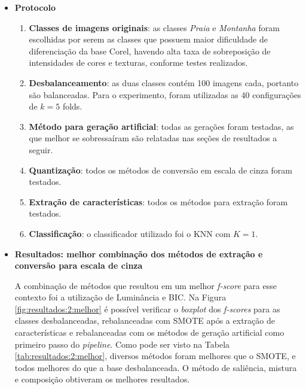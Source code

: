 \begin{itemize}
\item[] \textbf{Protocolo}
\begin{enumerate}
\item \textbf{Classes de imagens originais}: as classes \textit{Praia} e \emph{Montanha} foram escolhidas por serem as classes que possuem maior dificuldade de diferenciação da base Corel, havendo alta taxa de sobreposição de intensidades de cores e texturas, conforme testes realizados.

\item \textbf{Desbalanceamento}: as duas classes contém 100 imagens cada, portanto são balanceadas. Para o experimento, foram utilizadas as 40 configurações de $k=5$ folds.

\item \textbf{Método para geração artificial}: todas as gerações foram testadas, as que melhor se sobressaíram são relatadas nas seções de resultados a seguir.

\item \textbf{Quantização}: todos os métodos de conversão em escala de cinza foram testados.

\item \textbf{Extração de características}: todos os métodos para extração foram testados.

\item \textbf{Classificação}: o classificador utilizado foi o KNN com $K=1$.
\end{enumerate}

\item[] \textbf{Resultados: melhor combinação dos métodos de extração e conversão para escala de cinza}

A combinação de métodos que resultou em um melhor \textit{f-score} para esse contexto foi a utilização de Luminância e BIC. Na Figura \ref{fig:resultados:2:melhor} é possível verificar o \textit{boxplot} dos \textit{f-scores} para as classes desbalanceadas, rebalanceadas com SMOTE após a extração de características e rebalanceadas com os métodos de geração artificial como primeiro passo do \textit{pipeline}. Como pode ser visto na Tabela \ref{tab:resultados:2:melhor}, diversos métodos foram melhores que o SMOTE, e todos melhores do que a base desbalanceada. O método de saliência, mistura e composição obtiveram os melhores resultados.


\end{itemize}
